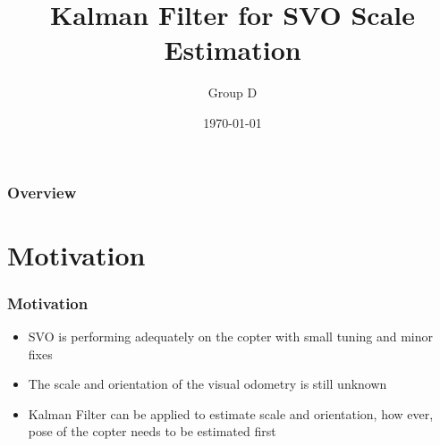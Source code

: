 \documentclass{beamer}
\title[Kalman Filter for SVO Scale Estimation]{Kalman Filter for SVO Scale Estimation} %
\author{Group D} %
\institute[TUT] %
{
Tampere University of Technology \\ %
\medskip
\textit{joonas.melin@tut.fi} %
}
\date{\today} %
\begin{document}
\begin{frame}
\titlepage %
\end{frame}

\begin{frame}
\frametitle{Overview} %
\tableofcontents %
\end{frame}


\section{Motivation} %


\begin{frame}
\frametitle{Motivation}
\begin{itemize}
 \item SVO is performing adequately on the copter with small tuning and minor fixes
 \item The scale and orientation of the visual odometry is still unknown
 \item Kalman Filter can be applied to estimate scale and orientation, how ever, pose of the copter needs to be estimated first
\end{itemize}

\end{frame}
\end{document}
